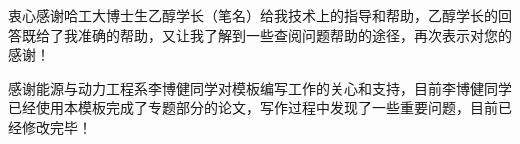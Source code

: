 \begin{thinking}
	衷心感谢哈工大博士生乙醇学长（笔名）给我技术上的指导和帮助，乙醇学长的回答既给了我准确的帮助，又让我了解到一些查阅问题帮助的途径，再次表示对您的感谢！
	
	感谢能源与动力工程系李博健同学对模板编写工作的关心和支持，目前李博健同学已经使用本模板完成了专题部分的论文，写作过程中发现了一些重要问题，目前已经修改完毕！
\end{thinking}